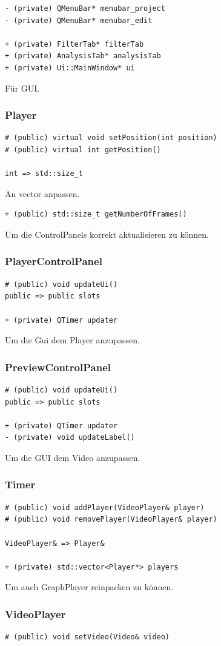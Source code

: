 \documentclass{scrartcl}
\begin{document}
{\begin{verbatim}
- (private) QMenuBar* menubar_project
- (private) QMenuBar* menubar_edit

+ (private) FilterTab* filterTab
+ (private) AnalysisTab* analysisTab
+ (private) Ui::MainWindow* ui
\end{verbatim}
Für GUI.
\newpage
\subsubsection{Player}
\begin{verbatim}
# (public) virtual void setPosition(int position)
# (public) virtual int getPosition()

int => std::size_t
\end{verbatim}
An vector anpassen.
\bigskip
\begin{verbatim}
+ (public) std::size_t getNumberOfFrames()
\end{verbatim}
Um die ControlPanels korrekt aktualisieren zu können.
\bigskip
\subsubsection{PlayerControlPanel}
\begin{verbatim}
# (public) void updateUi()
public => public slots

+ (private) QTimer updater
\end{verbatim}
Um die Gui dem Player anzupassen.
\subsubsection{PreviewControlPanel}
\begin{verbatim}
# (public) void updateUi()
public => public slots

+ (private) QTimer updater
- (private) void updateLabel()
\end{verbatim}
Um die GUI dem Video anzupassen.
\bigskip
\subsubsection{Timer}
\begin{verbatim}
# (public) void addPlayer(VideoPlayer& player)
# (public) void removePlayer(VideoPlayer& player)

VideoPlayer& => Player&

+ (private) std::vector<Player*> players
\end{verbatim}
Um auch GraphPlayer reinpacken zu können.
\newpage
\subsubsection{VideoPlayer}
\bigskip
\begin{verbatim}
# (public) void setVideo(Video& video)


\end{verbatim}}
\end{document}
